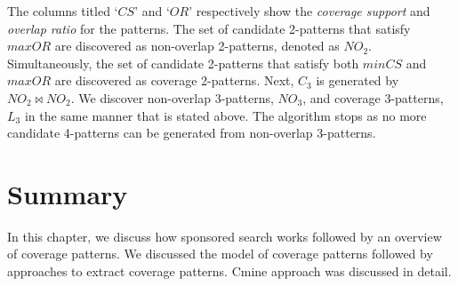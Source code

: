   The columns titled `$CS$' and `$OR$' respectively show the \emph{coverage support} and \emph{overlap ratio} for the patterns. The set of candidate 2-patterns that satisfy $maxOR$ are discovered as non-overlap 2-patterns, denoted as $NO_2$. Simultaneously, the set of candidate 2-patterns that satisfy both $minCS$ and $maxOR$ are discovered as coverage 2-patterns. Next, $C_3$ is generated by $NO_2 \Join NO_2$. We discover non-overlap 3-patterns, $NO_3$, and coverage 3-patterns, $L_3$ in the same manner that is stated above. The algorithm stops as no more candidate 4-patterns can be generated from non-overlap 3-patterns.


\section{Summary}
\label{sec:Summary3}
In this chapter, we discuss how sponsored search works followed by an overview of coverage patterns. We discussed the model of coverage patterns followed by approaches to extract coverage patterns. Cmine approach was discussed in detail. 